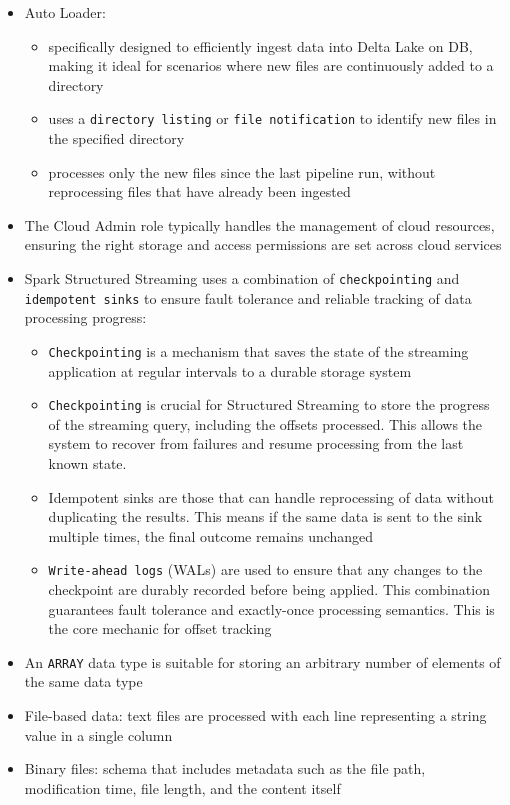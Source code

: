 \documentclass[11pt]{scrartcl}
\begin{document}
\begin{itemize}
	\item Auto Loader:
	\begin{itemize}
		\item specifically designed to efficiently ingest data into Delta Lake on DB, making it ideal for scenarios where new files are continuously added to a directory
		\item uses a \texttt{directory listing} or \texttt{file notification} to identify new files in the specified directory
		\item processes only the new files since the last pipeline run, without reprocessing files that have already been ingested
	\end{itemize}
	\item The Cloud Admin role typically handles the management of cloud resources, ensuring the right storage and access permissions are set across cloud services
	\item Spark Structured Streaming uses a combination of \texttt{checkpointing} and \texttt{idempotent sinks} to ensure fault tolerance and reliable tracking of data processing progress:
	\begin{itemize}
		\item \texttt{Checkpointing} is a mechanism that saves the state of the streaming application at regular intervals to a durable storage system
		\item \texttt{Checkpointing} is crucial for Structured Streaming to store the progress of the streaming query, including the offsets processed. This allows the system to recover from failures and resume processing from the last known state. 
		\item Idempotent sinks are those that can handle reprocessing of data without duplicating the results. This means if the same data is sent to the sink multiple times, the final outcome remains unchanged
		\item \texttt{Write-ahead logs} (WALs) are used to ensure that any changes to the checkpoint are durably recorded before being applied. This combination guarantees fault tolerance and exactly-once processing semantics. This is the core mechanic for offset tracking
	\end{itemize}
	\item An \texttt{ARRAY} data type is suitable for storing an arbitrary number of elements of the same data type
	\item File-based data: text files are processed with each line representing a string value in a single column
	\item Binary files: schema that includes metadata such as the file path, modification time, file length, and the content itself

\end{itemize}
\end{document}
